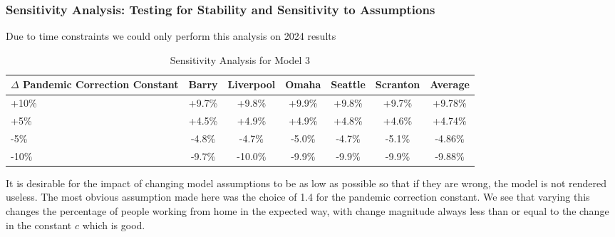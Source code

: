             \subsubsection{Sensitivity Analysis: Testing for Stability and Sensitivity to Assumptions}
                Due to time constraints we could only perform this analysis on 2024 results
                \begin{table}[h!]
                  \begin{center}
                    \label{tab:variables1} %
                    \begin{tabular}{|p{4cm}|c|c|c|c|c|c|} %
                      \toprule 
                       \textbf{$\Delta$ Pandemic Correction Constant} & \textbf{Barry} & \textbf{Liverpool} & \textbf{Omaha} & \textbf{Seattle} & \textbf{Scranton}& \textbf{Average}\\
                      \midrule 
                      +10\% & +9.7\% & +9.8\% & +9.9\% & +9.8\% & +9.7\% & +9.78\%\\
                       +5\%  & +4.5\% & +4.9\% & +4.9\% & +4.8\% & +4.6\% & +4.74\% \\ 
                       -5\% & -4.8\% & -4.7\% & -5.0\% & -4.7\% & -5.1\% & -4.86\%\\
                       -10\% & -9.7\% & -10.0\% & -9.9\% & -9.9\% & -9.9\% & -9.88\%\\
                      \bottomrule 
                    \end{tabular}
                    \caption{Sensitivity Analysis for Model 3} 
                  \end{center}
                \end{table}
                It is desirable for the impact of changing model assumptions to be as low as possible so that if they are wrong, the model is not rendered useless. The most obvious assumption made here was the choice of 1.4 for the pandemic correction constant. We see that varying this changes the percentage of people working from home in the expected way, with change magnitude always less than or equal to the change in the constant $c$ which is good.
                
